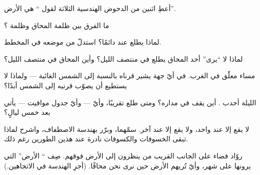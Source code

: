 \begin{exercise}[$\star$]\label{exo:g7:moon-phases:4}
أعطِ اثنين من الدحوض الهندسية الثلاثة لقول `` هي 
الأرض''.
\end{exercise}

\begin{exercise}[$\star$]\label{exo:g7:moon-phases:5}
ما الفرق بين ظلمة المحاق وظلمة ؟
\end{exercise}

\begin{exercise}[$\star$]\label{exo:g7:moon-phases:6}
لماذا يطلع  عند  دائمًا؟ استدلّ من موضعه في المخطط.
\end{exercise}

\begin{exercise}[$\star$]\label{exo:g7:moon-phases:7}
لماذا لا ``يرى'' أحد المحاق يطلع في منتصف الليل؟ وأين المحاق في
منتصف الليل؟
\end{exercise}

\begin{exercise}[$\star$]\label{exo:g7:moon-phases:8}
 مساء معلّق في الغرب. في أيّ جهة يشير قرناه بالنسبة إلى
الشمس الغائبة --- ولماذا لا يستطيع  أن يصوّب قرنيه إلى
الشمس أبدًا؟
\end{exercise}

\begin{exercise}[$\star\star$]\label{exo:g7:moon-phases:9}
 الليلة أحدب . أين يقف في مداره؟ ومتى طلع تقريبًا،
وأيّ  --- وأيّ جدول مواقيت --- يأتي بعد خمس ليالٍ؟
\end{exercise}

\begin{exercise}[$\star\star$]\label{exo:g7:moon-phases:10}
لا يقع  إلا عند  واحد، ولا يقع  إلا عند 
آخر. سمّهما، وبرّر بهندسة الاصطفاف، واشرح لماذا تبقى الخسوفات
والكسوفات نادرة عند هذين الطورين رغم ذلك.
\end{exercise}

\begin{exercise}[$\star\star$]\label{exo:g7:moon-phases:11}
روّاد فضاء على الجانب القريب من  ينظرون إلى الأرض فوقهم.
صِف `` الأرض'' التي يرونها على  شهر، وأيّ  تُريهم
الأرض حين نرى نحن محاقًا. (أجرِ الهندسة في الاتجاهين.)
\end{exercise}

